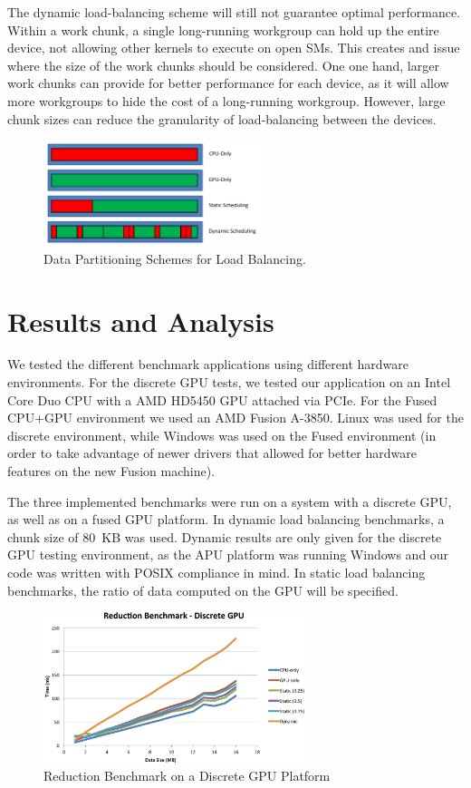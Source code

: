 \documentclass[journal]{IEEEtran}
\begin{document}
The dynamic load-balancing scheme will still not guarantee optimal performance.
Within a work chunk, a single long-running workgroup can hold up the entire device,
not allowing other kernels to execute on open SMs.  This creates and issue where the
size of the work chunks should be considered.  One one hand, larger work chunks can
provide for better performance for each device, as it will allow more workgroups to
hide the cost of a long-running workgroup.  However, large chunk sizes can reduce
the granularity of load-balancing between the devices.

\begin{figure}[t]
\centering
\includegraphics[width=2.5in]{scheduling}
\caption{Data Partitioning Schemes for Load Balancing.}
\label{fig:scheduling}
\end{figure}

\section{Results and Analysis}
We tested the different benchmark applications using different hardware environments.
For the discrete GPU tests, we tested our application on an Intel Core Duo CPU with a
AMD HD5450 GPU attached via PCIe.  For the Fused CPU+GPU environment we used an AMD
Fusion A-3850.  Linux was used for the discrete environment, while Windows was used
on the Fused environment (in order to take advantage of newer drivers that allowed
for better hardware features on the new Fusion machine).  

The three implemented benchmarks were run on a system with a discrete GPU, as well as
on a fused GPU platform.  In dynamic load balancing benchmarks, a chunk size of 80~KB
was used.  Dynamic results are only given for the discrete GPU testing environment,
as the APU platform was running Windows and our code was written with POSIX compliance
in mind.  In static load balancing benchmarks, the ratio of data computed on the GPU
will be specified.

\begin{figure}[t]
\centering
\includegraphics[width=3.0in]{reduce_discrete}
\caption{Reduction Benchmark on a Discrete GPU Platform}
\label{fig:reduce_discrete}
\end{figure}
\end{document}
